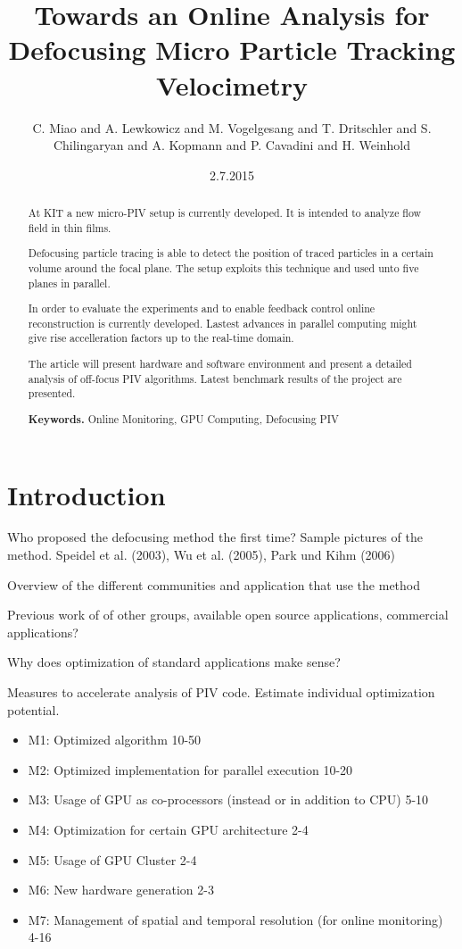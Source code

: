 \documentclass[11pt,draft]{amsart}
\title{Towards an Online Analysis for Defocusing Micro Particle Tracking Velocimetry}
\author{C. Miao and A. Lewkowicz and M. Vogelgesang and T. Dritschler and S. Chilingaryan and A. Kopmann and P. Cavadini and H. Weinhold}
\date{2.7.2015}                     %
\begin{document}
\maketitle

\begin{abstract}

At KIT a new micro-PIV setup is currently developed. 
It is intended to analyze flow field in thin films. 

Defocusing particle tracing is able to detect the position of traced particles in a certain volume around the focal plane. The setup exploits this technique and used unto five
planes in parallel. 

In order to evaluate the experiments and to enable feedback control online reconstruction is currently developed. Lastest advances in parallel computing might give rise accelleration factors up to the real-time domain. 

The article will present hardware and software environment and present a detailed analysis of off-focus PIV algorithms. Latest benchmark results of the project are presented.

\smallskip
\noindent \textbf{Keywords.} Online Monitoring, GPU Computing, Defocusing PIV
\end{abstract}



\section{Introduction}

Who proposed the defocusing method the first time? Sample pictures of the method. 
Speidel et al. (2003), Wu et al. (2005), Park und Kihm (2006)


Overview of the different communities and application that use the method


Previous work of of other groups, available open source applications, commercial applications?

Why does optimization of standard applications make sense?


Measures to accelerate analysis of PIV code. Estimate individual optimization potential. 
\begin{itemize}
\item M1: Optimized algorithm 10-50
\item M2: Optimized implementation for parallel execution 10-20
\item M3: Usage of GPU as co-processors (instead or in addition to CPU) 5-10
\item M4: Optimization for certain GPU architecture 2-4
\item M5: Usage of GPU Cluster 2-4
\item M6: New hardware generation 2-3
\item M7: Management of spatial and temporal resolution (for online monitoring) 4-16
\end{itemize}
\end{document}
